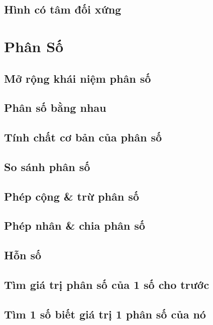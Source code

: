 \documentclass{article}
\numberwithin{equation}{section}
\begin{document}
\subsection{Hình có tâm đối xứng}


\newpage
\section{Phân Số}

\subsection{Mở rộng khái niệm phân số}

\subsection{Phân số bằng nhau}

\subsection{Tính chất cơ bản của phân số}

\subsection{So sánh phân số}

\subsection{Phép cộng \& trừ phân số}

\subsection{Phép nhân \& chia phân số}

\subsection{Hỗn số}

\subsection{Tìm giá trị phân số của 1 số cho trước}

\subsection{Tìm 1 số biết giá trị 1 phân số của nó}
\end{document}
